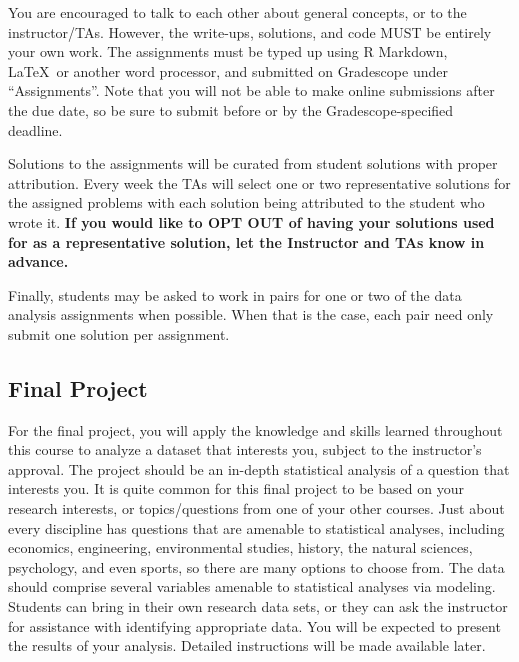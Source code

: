 \documentclass[11pt, a4paper]{article}
\begin{document}
You are encouraged to talk to each other about general concepts, or to the instructor/TAs. However, the write-ups, solutions, and code MUST be entirely your own work. The assignments must be typed up using \textsf{R} Markdown, \LaTeX \ or another word processor, and submitted on Gradescope under ``Assignments''. Note that you will not be able to make online submissions after the due date, so be sure to submit before or by the Gradescope-specified deadline.

Solutions to the assignments will be curated from student solutions with proper attribution. Every week the TAs will select one or two representative solutions for the assigned problems with each solution being attributed to the student who wrote it. \textbf{If you would like to OPT OUT of having your solutions used for as a representative solution, let the Instructor and TAs know in advance.}

Finally, students may be asked to work in pairs for one or two of the data analysis assignments when possible. When that is the case, each pair need only submit one solution per assignment.


\subsection{Final Project}
For the final project, you will apply the knowledge and skills learned throughout this course to analyze a dataset that interests you, subject to the instructor's approval. The project should be an in-depth statistical analysis of a question that interests you. It is quite common for this final project to be based on your research interests, or topics/questions from one of your other courses. Just about every discipline has questions that are amenable to statistical analyses, including economics, engineering, environmental studies, history, the natural sciences, psychology, and even sports, so there are many options to choose from. The data should comprise several variables amenable to statistical analyses via modeling. Students can bring in their own research data sets, or they can ask the instructor for assistance with identifying appropriate data. You will be expected to present the results of your analysis. Detailed instructions will be made available later.
\end{document}
